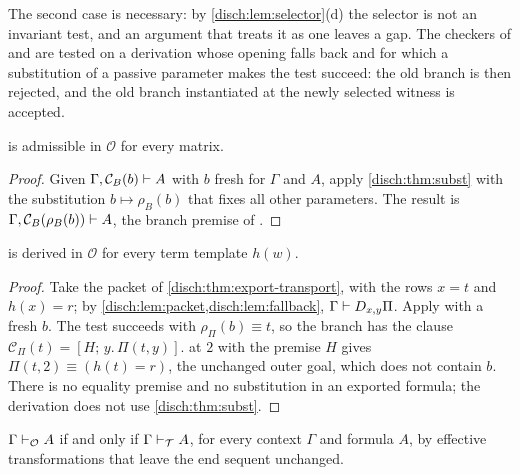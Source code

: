 The second case is necessary: by \cref{disch:lem:selector}(d) the selector
is not an invariant test, and an argument that treats it as one leaves a
gap. The checkers of  and
 are tested on a derivation whose opening
falls back and for which a substitution of a passive parameter makes the
test succeed: the old branch is then rejected, and the old branch
instantiated at the newly selected witness is accepted.

\begin{corollary}
\label{disch:cor:open-elim}
 is admissible in $\mathcal O$ for every matrix.
\end{corollary}

\begin{proof}
Given $\Gamma,\mathcal C_B(b)\vdash A$ with $b$ fresh for $\Gamma$ and
$A$, apply \cref{disch:thm:subst} with the substitution
$b\mapsto\rho_B(b)$ that fixes all other parameters. The result is
$\Gamma,\mathcal C_B(\rho_B(b))\vdash A$, the branch premise of
.
\end{proof}

\begin{theorem}
\label{disch:thm:open-transport}
 is derived in $\mathcal O$ for every term template $h(w)$.
\end{theorem}

\begin{proof}
Take the packet of \cref{disch:thm:export-transport}, with the rows
$x=t$ and $h(x)=r$; by \cref{disch:lem:packet,disch:lem:fallback},
$\Gamma\vdash D_{x,y}\Pi$. Apply  with a fresh $b$. The
test succeeds with $\rho_\Pi(b)\equiv t$, so the branch has the clause
$\mathcal C_\Pi(t)=[H;\,y.\,\Pi(t,y)]$.  at $2$ with the
premise $H$ gives $\Pi(t,2)\equiv(h(t)=r)$, the unchanged outer goal,
which does not contain $b$. There is no equality premise and no
substitution in an exported formula; the derivation does not use
\cref{disch:thm:subst}.
\end{proof}

\begin{theorem}
\label{disch:thm:open}
$\Gamma\vdash_{\mathcal O}A$ if and only if $\Gamma\vdash_{\mathcal T}A$,
for every context $\Gamma$ and formula $A$, by effective transformations
that leave the end sequent unchanged.
\end{theorem}


